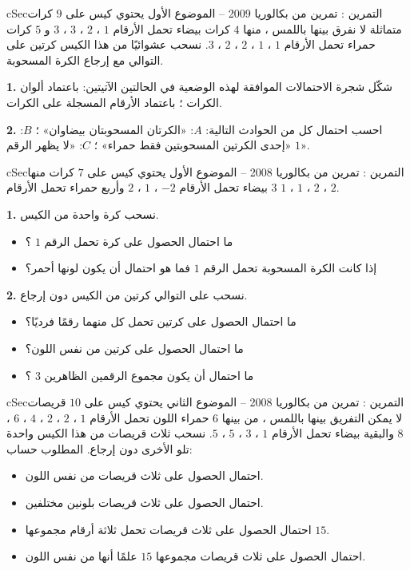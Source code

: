 \documentclass[12pt,a4paper]{article}
\newenvironment{BOX}[2]{\begin{otherlanguage}{english}\begin{arbox}{#1}{#2}}{\end{arbox}\end{otherlanguage}}
\newcounter{exo}
\newenvironment{tamrin}[1]{\stepcounter{exo}\begin{BOX}{cSec}{التمرين \theexo: #1}}{\end{BOX}}
\newenvironment{sq}{\begin{itemize}[leftmargin=2.4em,itemsep=3pt]}{\end{itemize}}
\newcommand{\qa}{\item[(أ)]}\newcommand{\qb}{\item[(ب)]}\newcommand{\qc}{\item[(جـ)]}\newcommand{\qd}{\item[(د)]}\newcommand{\qe}{\item[(هـ)]}
\newcommand{\QQ}[1]{\par\smallskip\textbf{#1.} }
\begin{document}
\begin{tamrin}{تمرين من بكالوريا 2009 -- الموضوع الأول}
يحتوي كيس على $9$ كرات متماثلة لا نفرق بينها باللمس ، منها $4$ كرات بيضاء تحمل الأرقام $1$ ، $2$ ، $3$ ، $3$ و $5$ كرات حمراء تحمل الأرقام $1$ ، $1$ ، $2$ ، $2$ ، $3$. نسحب عشوائيًا من هذا الكيس كرتين على التوالي مع إرجاع الكرة المسحوبة.
\QQ{1} شكّل شجرة الاحتمالات الموافقة لهذه الوضعية في الحالتين الآتيتين: باعتماد ألوان الكرات ؛ باعتماد الأرقام المسجلة على الكرات.
\QQ{2} احسب احتمال كل من الحوادث التالية: $A$: «الكرتان المسحوبتان بيضاوان» ؛ $B$: «إحدى الكرتين المسحوبتين فقط حمراء» ؛ $C$: «لا يظهر الرقم $1$».
\end{tamrin}
\begin{tamrin}{تمرين من بكالوريا 2008 -- الموضوع الأول}
يحتوي كيس على $7$ كرات منها $3$ بيضاء تحمل الأرقام $-2$ ، $1$ ، $2$ وأربع حمراء تحمل الأرقام $1$ ، $1$ ، $2$ ، $2$.
\QQ{1} نسحب كرة واحدة من الكيس.
\begin{sq}
\qa ما احتمال الحصول على كرة تحمل الرقم $1$ ؟
\qb إذا كانت الكرة المسحوبة تحمل الرقم $1$ فما هو احتمال أن يكون لونها أحمر؟
\end{sq}
\QQ{2} نسحب على التوالي كرتين من الكيس دون إرجاع.
\begin{sq}
\qa ما احتمال الحصول على كرتين تحمل كل منهما رقمًا فرديًا؟
\qb ما احتمال الحصول على كرتين من نفس اللون؟
\qc ما احتمال أن يكون مجموع الرقمين الظاهرين $3$ ؟
\end{sq}
\end{tamrin}
\begin{tamrin}{تمرين من بكالوريا 2008 -- الموضوع الثاني}
يحتوي كيس على $10$ قريصات لا يمكن التفريق بينها باللمس ، من بينها $6$ حمراء اللون تحمل الأرقام $1$ ، $2$ ، $2$ ، $4$ ، $6$ ، $8$ والبقية بيضاء تحمل الأرقام $1$ ، $3$ ، $5$ ، $5$. نسحب ثلاث قريصات من هذا الكيس واحدة تلو الأخرى دون إرجاع. المطلوب حساب:
\begin{sq}
\qa احتمال الحصول على ثلاث قريصات من نفس اللون.
\qb احتمال الحصول على ثلاث قريصات بلونين مختلفين.
\qc احتمال الحصول على ثلاث قريصات تحمل ثلاثة أرقام مجموعها $15$.
\qd احتمال الحصول على ثلاث قريصات مجموعها $15$ علمًا أنها من نفس اللون.
\end{sq}
\end{tamrin}
\end{document}
